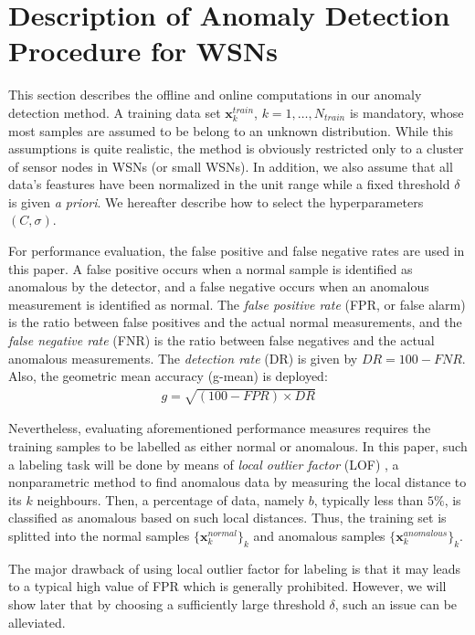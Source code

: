 \documentclass[conference]{IEEEtran}
\theoremstyle{problemstyle}
\begin{document}
\section{Description of Anomaly Detection Procedure for WSNs}\label{sec:implementation}

This section describes the offline and online computations in our anomaly detection method. A training data set $\mathbf{x}_k^{train}$, $k=1,\dots,N_{train}$ is mandatory, whose most samples are assumed to be belong to an unknown distribution. While this assumptions is quite realistic, the method is obviously restricted only to a cluster of sensor nodes in WSNs (or small WSNs). In addition, we also assume that all data's feastures have been normalized in the unit range while a fixed threshold $\delta$ is given \emph{a priori}. We hereafter describe how to select the hyperparameters $(C, \sigma)$.

For performance evaluation, the false positive and false negative rates are used in this paper. A false positive occurs when a normal sample is identified as anomalous by the detector, and a false negative occurs when an anomalous measurement is identified as normal. The \emph{false positive rate} (FPR, or false alarm) is the ratio between false positives and the actual normal measurements, and the \emph{false negative rate} (FNR) is the ratio between false negatives and the actual anomalous measurements. The \emph{detection rate} (DR) is given by $DR=100-FNR$. Also, the geometric mean accuracy (g-mean) is deployed:
\begin{align}\label{eq:gmean}
g = \sqrt{(100-FPR) \times DR}
\end{align}

Nevertheless, evaluating aforementioned performance measures requires the training samples to be labelled as either normal or anomalous. In this paper, such a labeling task will be done by means of \emph{local outlier factor} (LOF) \cite{breunig2000lof}, a nonparametric method to find anomalous data by measuring the local distance to its $k$ neighbours. Then, a percentage of data, namely $b$, typically less than $5 \%$, is classified as anomalous based on such local distances. Thus, the training set is splitted into the normal samples $\{\mathbf{x}_k^{normal}\}_k$ and anomalous samples $\{\mathbf{x}_k^{anomalous}\}_k$.

The major drawback of using local outlier factor for labeling is that it may leads to a typical high value of FPR which is generally prohibited. However, we will show later that by choosing a sufficiently large threshold $\delta$, such an issue can be alleviated.
\end{document}

